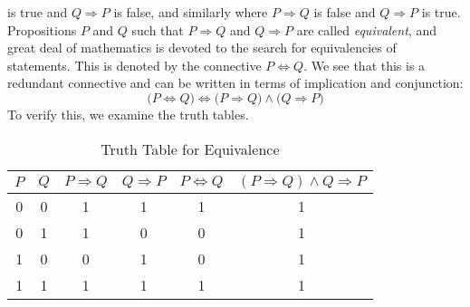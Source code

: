         is true and $Q\Rightarrow{P}$ is false, and similarly where
        $P\Rightarrow{Q}$ is false and $Q\Rightarrow{P}$ is true. Propositions
        $P$ and $Q$ such that $P\Rightarrow{Q}$ and $Q\Rightarrow{P}$ are called
        \textit{equivalent}, and great deal of mathematics is devoted to the
        search for equivalencies of statements. This is denoted by the
        connective $P\Leftrightarrow{Q}$. We see that this is a redundant
        connective and can be written in terms of implication and conjunction:
        \begin{equation}
            \big(P\Leftrightarrow{Q}\big)\Longleftrightarrow
            \big(P\Rightarrow{Q}\big)\land\big(Q\Rightarrow{P}\big)
        \end{equation}
        To verify this, we examine the truth tables.
        \begin{table}[H]
            \centering
            \captionsetup{type=table}
            \begin{tabular}{cccccc}
                $P$&$Q$&$P\Rightarrow{Q}$&$Q\Rightarrow{P}$
                   &$P\Leftrightarrow{Q}$
                   &$(P\Rightarrow{Q})\land{Q\Rightarrow{P}}$\\
                \hline
                0&0&1&1&1&1\\
                0&1&1&0&0&1\\
                1&0&0&1&0&1\\
                1&1&1&1&1&1
            \end{tabular}
            \caption{Truth Table for Equivalence}
            \label{tab:Truth_Table_for_Equivalence}
        \end{table}
